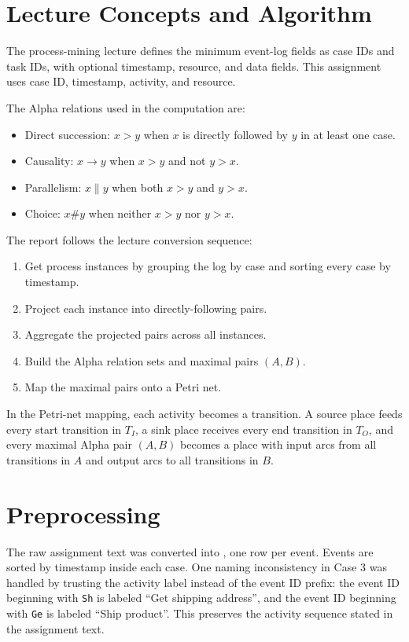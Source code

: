\documentclass[11pt,a4paper]{article}
\begin{document}
\section{Lecture Concepts and Algorithm}
The process-mining lecture defines the minimum event-log fields as case IDs and task IDs, with optional timestamp, resource, and data fields. This assignment uses case ID, timestamp, activity, and resource.

The Alpha relations used in the computation are:
\begin{itemize}
  \item Direct succession: $x > y$ when $x$ is directly followed by $y$ in at least one case.
  \item Causality: $x \rightarrow y$ when $x > y$ and not $y > x$.
  \item Parallelism: $x \parallel y$ when both $x > y$ and $y > x$.
  \item Choice: $x \# y$ when neither $x > y$ nor $y > x$.
\end{itemize}

The report follows the lecture conversion sequence:
\begin{enumerate}
  \item Get process instances by grouping the log by case and sorting every case by timestamp.
  \item Project each instance into directly-following pairs.
  \item Aggregate the projected pairs across all instances.
  \item Build the Alpha relation sets and maximal pairs $(A,B)$.
  \item Map the maximal pairs onto a Petri net.
\end{enumerate}

In the Petri-net mapping, each activity becomes a transition. A source place feeds every start transition in $T_I$, a sink place receives every end transition in $T_O$, and every maximal Alpha pair $(A,B)$ becomes a place with input arcs from all transitions in $A$ and output arcs to all transitions in $B$.

\section{Preprocessing}
The raw assignment text was converted into , one row per event. Events are sorted by timestamp inside each case. One naming inconsistency in Case 3 was handled by trusting the activity label instead of the event ID prefix: the event ID beginning with \texttt{Sh} is labeled ``Get shipping address'', and the event ID beginning with \texttt{Ge} is labeled ``Ship product''. This preserves the activity sequence stated in the assignment text.
\end{document}
